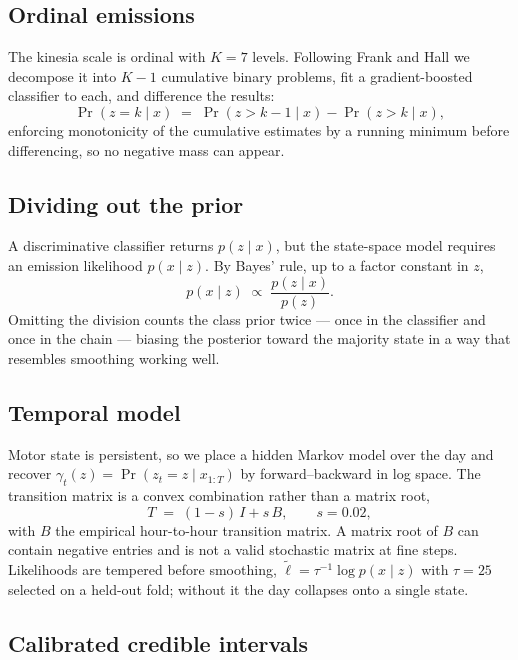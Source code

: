 \documentclass[11pt,a4paper]{article}
\begin{document}
\subsection{Ordinal emissions}

The kinesia scale is ordinal with $K=7$ levels. Following Frank and Hall we
decompose it into $K-1$ cumulative binary problems, fit a gradient-boosted
classifier to each, and difference the results:
\begin{equation}
\Pr(z = k \mid x) \;=\; \Pr(z > k-1 \mid x) - \Pr(z > k \mid x),
\end{equation}
enforcing monotonicity of the cumulative estimates by a running minimum before
differencing, so no negative mass can appear.

\subsection{Dividing out the prior}

A discriminative classifier returns $p(z \mid x)$, but the state-space model
requires an emission likelihood $p(x \mid z)$. By Bayes' rule, up to a factor
constant in $z$,
\begin{equation}
p(x \mid z) \;\propto\; \frac{p(z \mid x)}{p(z)} .
\end{equation}
Omitting the division counts the class prior twice --- once in the classifier
and once in the chain --- biasing the posterior toward the majority state in a
way that resembles smoothing working well.

\subsection{Temporal model}

Motor state is persistent, so we place a hidden Markov model over the day and
recover $\gamma_t(z) = \Pr(z_t = z \mid x_{1:T})$ by forward--backward in log
space. The transition matrix is a convex combination rather than a matrix root,
\begin{equation}
T \;=\; (1-s)\,I + s\,B , \qquad s = 0.02,
\end{equation}
with $B$ the empirical hour-to-hour transition matrix. A matrix root of $B$ can
contain negative entries and is not a valid stochastic matrix at fine steps.
Likelihoods are tempered before smoothing, $\tilde\ell = \tau^{-1}\log p(x\mid z)$
with $\tau=25$ selected on a held-out fold; without it the day collapses onto a
single state.

\subsection{Calibrated credible intervals}
\end{document}
